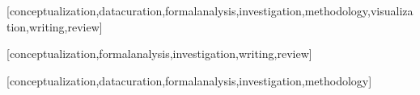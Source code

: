 	\begin{contributors}
	[conceptualization,datacuration,formalanalysis,investigation,methodology,visualization,writing,review]
	
	[conceptualization,formalanalysis,investigation,writing,review]
	
	[conceptualization,datacuration,formalanalysis,investigation,methodology]
\end{contributors}
